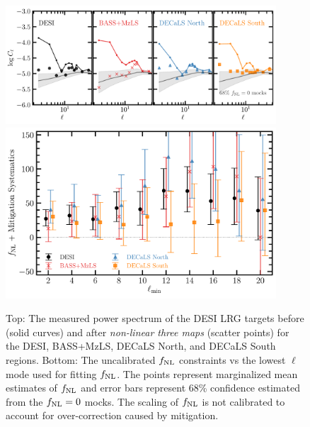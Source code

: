 \begin{figure}
    \centering
    \includegraphics[width=0.9\textwidth]{figures/cldr9_lowell.pdf}
    \includegraphics[width=0.9\textwidth]{figures/fnl_elmin.pdf}  
    \caption{Top: The measured power spectrum of the DESI LRG targets before (solid curves) and after \textit{non-linear three maps} (scatter points) for the DESI, BASS+MzLS, DECaLS North, and DECaLS South regions. Bottom: The uncalibrated $f_{\rm NL}$ constraints vs the lowest $\ell$ mode used for fitting $f_{\rm NL}$. The points represent marginalized mean estimates of $f_{\rm NL}$ and error bars represent $68$\% confidence estimated from the $f_{\rm NL}=0$ mocks. The scaling of $f_{\rm NL}$ is not calibrated to account for over-correction caused by mitigation.}\label{fig:mcmc_dr9elmin}
\end{figure}

